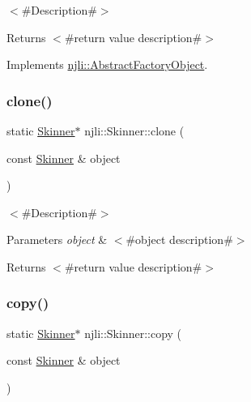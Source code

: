$<$\#\+Description\#$>$

\begin{DoxyReturn}{Returns}
$<$\#return value description\#$>$ 
\end{DoxyReturn}


Implements \mbox{\hyperlink{classnjli_1_1_abstract_factory_object_a4763d05bc9dc37c559111f8bb30e1dd8}{njli\+::\+Abstract\+Factory\+Object}}.

\mbox{\label{classnjli_1_1_skinner_a099db5a3a6cacd9ae2485fb4e9b05998}} 
\subsubsection{\texorpdfstring{clone()}{clone()}}
{\footnotesize\ttfamily static \mbox{\hyperlink{classnjli_1_1_skinner}{Skinner}}$\ast$ njli\+::\+Skinner\+::clone (\begin{DoxyParamCaption}\item[{const \mbox{\hyperlink{classnjli_1_1_skinner}{Skinner}} \&}]{object }\end{DoxyParamCaption})\hspace{0.3cm}{\ttfamily [static]}}

$<$\#\+Description\#$>$


\begin{DoxyParams}{Parameters}
{\em object} & $<$\#object description\#$>$\\
\hline
\end{DoxyParams}
\begin{DoxyReturn}{Returns}
$<$\#return value description\#$>$ 
\end{DoxyReturn}
\mbox{\label{classnjli_1_1_skinner_ab8442114221e6016091c544584da30fe}} 
\subsubsection{\texorpdfstring{copy()}{copy()}}
{\footnotesize\ttfamily static \mbox{\hyperlink{classnjli_1_1_skinner}{Skinner}}$\ast$ njli\+::\+Skinner\+::copy (\begin{DoxyParamCaption}\item[{const \mbox{\hyperlink{classnjli_1_1_skinner}{Skinner}} \&}]{object }\end{DoxyParamCaption})\hspace{0.3cm}{\ttfamily [static]}}

